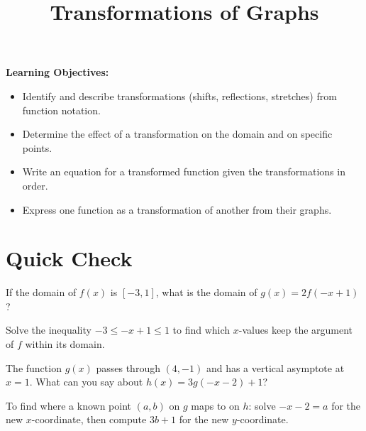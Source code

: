 \documentclass{ximera}
\title{Transformations of Graphs}
\begin{document}
\begin{abstract}
\end{abstract}
\maketitle

\textbf{Learning Objectives:}
\begin{itemize}
  \item Identify and describe transformations (shifts, reflections, stretches) from function notation.
  \item Determine the effect of a transformation on the domain and on specific points.
  \item Write an equation for a transformed function given the transformations in order.
  \item Express one function as a transformation of another from their graphs.
\end{itemize}
\medskip

\section*{Quick Check}

\begin{problem}
If the domain of $f(x)$ is $[-3,1]$, what is the domain of $g(x) = 2f(-x+1)$?
\begin{hint}
Solve the inequality $-3 \leq -x+1 \leq 1$ to find which $x$-values keep the argument of $f$ within its domain.
\end{hint}
\begin{multipleChoice}
  \choice{$[-2,2]$}
  \choice{$[-6,2]$}
  \choice{$[-1,3]$}
  \choice[correct]{$[0,4]$}
\end{multipleChoice}
\end{problem}

\begin{problem}
The function $g(x)$ passes through $(4,-1)$ and has a vertical asymptote at $x=1$. What can you say about $h(x) = 3g(-x-2)+1$?
\begin{hint}
To find where a known point $(a,b)$ on $g$ maps to on $h$: solve $-x-2 = a$ for the new $x$-coordinate, then compute $3b+1$ for the new $y$-coordinate.
\end{hint}
\begin{multipleChoice}
\end{multipleChoice}
\end{problem}
\end{document}
